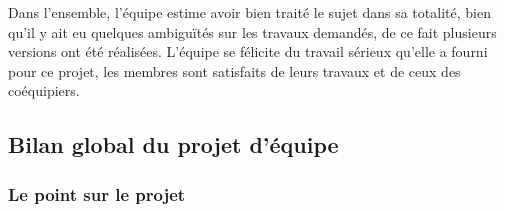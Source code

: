 \documentclass[12pt]{article}
\begin{document}
    Dans l'ensemble, l'équipe estime avoir bien traité le sujet dans sa totalité, bien qu'il y ait eu quelques ambiguïtés sur les travaux demandés, de ce fait plusieurs versions ont été réalisées. L'équipe se félicite du travail sérieux qu'elle a fourni pour ce projet, les membres sont satisfaits de leurs travaux et de ceux des coéquipiers.
    \newpage
    \subsection*{Bilan global du projet d'équipe}
        
        
        \subsubsection*{Le point sur le projet}
\end{document}
